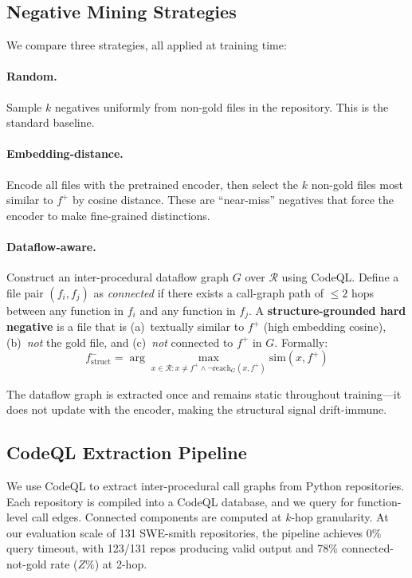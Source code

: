 \documentclass[11pt,a4paper]{article}
\begin{document}
\subsection{Negative Mining Strategies}

We compare three strategies, all applied at training time:

\paragraph{Random.} Sample $k$ negatives uniformly from non-gold files in the repository. This is the standard baseline.

\paragraph{Embedding-distance.} Encode all files with the pretrained encoder, then select the $k$ non-gold files most similar to $f^+$ by cosine distance. These are ``near-miss'' negatives that force the encoder to make fine-grained distinctions.

\paragraph{Dataflow-aware.} Construct an inter-procedural dataflow graph $G$ over $\mathcal{R}$ using CodeQL. Define a file pair $(f_i, f_j)$ as \emph{connected} if there exists a call-graph path of $\leq 2$ hops between any function in $f_i$ and any function in $f_j$. A \textbf{structure-grounded hard negative} is a file that is (a)~textually similar to $f^+$ (high embedding cosine), (b)~\emph{not} the gold file, and (c)~\emph{not} connected to $f^+$ in $G$. Formally:
\begin{equation}
f^-_{\text{struct}} = \arg\max_{x \in \mathcal{R} : x \neq f^+ \wedge \neg \text{reach}_G(x, f^+)} \text{sim}(x, f^+)
\end{equation}

The dataflow graph is extracted once and remains static throughout training---it does not update with the encoder, making the structural signal drift-immune.

\subsection{CodeQL Extraction Pipeline}

We use CodeQL to extract inter-procedural call graphs from Python repositories. Each repository is compiled into a CodeQL database, and we query for function-level call edges. Connected components are computed at $k$-hop granularity. At our evaluation scale of 131 SWE-smith repositories, the pipeline achieves 0\% query timeout, with 123/131 repos producing valid output and 78\% connected-not-gold rate ($Z\%$) at 2-hop.
\end{document}
